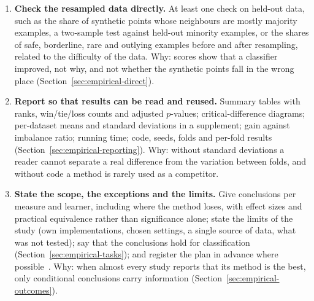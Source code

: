 \begin{enumerate}
  \item \textbf{Check the resampled data directly.} At least one check on held-out data, such as the share of synthetic points whose neighbours are mostly majority examples, a two-sample test against held-out minority examples, or the shares of safe, borderline, rare and outlying examples before and after resampling, related to the difficulty of the data. Why: scores show that a classifier improved, not why, and not whether the synthetic points fall in the wrong place (Section~\ref{sec:empirical-direct}).
  \item \textbf{Report so that results can be read and reused.} Summary tables with ranks, win/tie/loss counts and adjusted $p$-values; critical-difference diagrams; per-dataset means and standard deviations in a supplement; gain against imbalance ratio; running time; code, seeds, folds and per-fold results (Section~\ref{sec:empirical-reporting}). Why: without standard deviations a reader cannot separate a real difference from the variation between folds, and without code a method is rarely used as a competitor.
  \item \textbf{State the scope, the exceptions and the limits.} Give conclusions per measure and learner, including where the method loses, with effect sizes and practical equivalence rather than significance alone; state the limits of the study (own implementations, chosen settings, a single source of data, what was not tested); say that the conclusions hold for classification (Section~\ref{sec:empirical-tasks}); and register the plan in advance where possible~\parencite{yadav2025ciso}. Why: when almost every study reports that its method is the best, only conditional conclusions carry information (Section~\ref{sec:empirical-outcomes}).
\end{enumerate}



